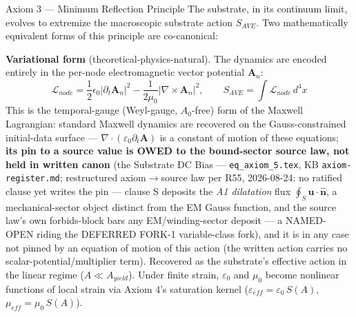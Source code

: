 %
%
\begin{resultbox}{Axiom 3 — Minimum Reflection Principle}
The substrate, in its continuum limit, evolves to extremize the macroscopic substrate action $S_{AVE}$. Two mathematically equivalent forms of this principle are co-canonical:

\medskip\noindent\textbf{Variational form} (theoretical-physics-natural). The dynamics are encoded entirely in the per-node electromagnetic vector potential $\mathbf{A}_n$:
\begin{equation}
    \mathcal{L}_{node} = \frac{1}{2}\epsilon_0 |\partial_t \mathbf{A}_n|^2 - \frac{1}{2\mu_0} |\nabla \times \mathbf{A}_n|^2,\qquad
    S_{AVE} = \int \mathcal{L}_{node}\, d^4x
    \label{eq:axiom3_lagrangian}
\end{equation}
This is the temporal-gauge (Weyl-gauge, $A_0$-free) form of the Maxwell Lagrangian: standard Maxwell dynamics are recovered on the Gauss-constrained initial-data surface --- $\nabla\cdot(\varepsilon_0\partial_t\mathbf{A})$ is a constant of motion of these equations; \textbf{its pin to a source value is OWED to the bound-sector source law, not held in written canon} (the Substrate DC Bias --- \texttt{eq\_axiom\_5.tex}, KB \texttt{axiom-register.md}; restructured axiom$\to$source law per R55, 2026-08-24: no ratified clause yet writes the pin --- clause S deposits the \emph{A1 dilatation} flux $\oint_S \mathbf{u}\cdot\hat{\mathbf{n}}$, a mechanical-sector object distinct from the EM Gauss function, and the source law's own forbids-block bars any EM/winding-sector deposit --- a NAMED-OPEN riding the DEFERRED FORK-1 variable-class fork), and it is in any case not pinned by an equation of motion of this action (the written action carries no scalar-potential/multiplier term). Recovered as the substrate's effective action in the linear regime ($A \ll A_{yield}$). Under finite strain, $\varepsilon_0$ and $\mu_0$ become nonlinear functions of local strain via Axiom 4's saturation kernel ($\varepsilon_{eff} = \varepsilon_0\, S(A)$, $\mu_{eff} = \mu_0\, S(A)$).


\end{resultbox}
